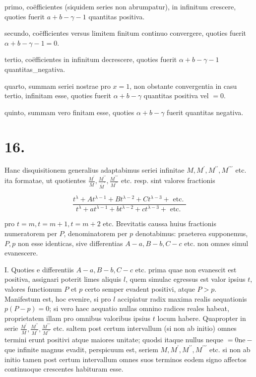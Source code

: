 \documentclass[10pt]{article}
\begin{document}
primo, coëfficientes (siquidem series non abrumpatur), in infinitum crescere, quoties fuerit \(a+b-\gamma-1\) quantitas positiva.

secundo, coëfficientes versus limitem finitum continuo convergere, quoties fuerit \(\alpha+b-\gamma-1=0\).

tertio, coëfficientes in infinitum decrescere, quoties fuerit \(\alpha+b-\gamma-1\) quantitas\_negativa.

quarto, summam seriei nostrae pro \(x=1\), non obstante convergentia in casu tertio, infinitam esse, quoties fuerit \(\alpha+b-\gamma\) quantitas positiva vel \(=0\).

quinto, summam vero finitam esse, quoties \(\alpha+b-\gamma\) fuerit quantitas negativa.

\section*{16.}
Hanc disquisitionem generalius adaptabimus seriei infinitae \(M, M^{\prime}, M^{\prime \prime}, M^{\prime \prime \prime}\) etc. ita formatae, ut quotientes \(\frac{M^{\prime}}{\bar{M}}, \frac{M^{\prime \prime}}{\bar{M}^{\prime}}, \frac{M^{\prime \prime \prime}}{M^{\prime \prime}}\) etc. resp. sint valores fractionis

\[
\frac{t^{\lambda}+A t^{\lambda-1}+B t^{\lambda-2}+C t^{\lambda-3}+\text { etc. }}{t^{\lambda}+a t^{\lambda-1}+b t^{\lambda-2}+c t^{\lambda-3}+\text { etc. }}
\]

pro \(t=m, t=m+1, t=m+2\) etc. Brevitatis caussa huius fractionis numeratorem per \(P\), denominatorem per \(p\) denotabimus: praeterea supponemus, \(P, p\) non esse identicas, sive differentias \(A-a, B-b, C-c\) etc. non omnes simul evanescere.

I. Quoties e differentiis \(A-a, B-b, C-c\) etc. prima quae non evanescit est positiva, assignari poterit limes aliquis \(l\), quem simulac egressus est valor ipsius \(t\), valores functionum \(P\) et \(p\) certo semper evadent positivi, atque \(P>p\). Manifestum est, hoc evenire, si pro \(l\) accipiatur radix maxima realis aequationis \(p(P-p)=0\); si vero haec aequatio nullas omnino radices reales habeat, proprietatem illam pro omnibus valoribus ipsius \(t\) locum habere. Quapropter in serie \(\frac{M^{\prime}}{\bar{M}}, \frac{M^{\prime \prime}}{M^{\prime}}, \frac{M^{\prime \prime \prime}}{M^{\prime \prime}}\) etc. saltem post certum intervallum (si non ab initio) omnes termini erunt positivi atque maiores unitate; quodsi itaque nullus neque \(=0 \mathrm{ne}-\) que infinite magnus evadit, perspicuum est,
seriem \(M, M^{\prime}, M^{\prime \prime}, M^{\prime \prime \prime}\) etc. si non ab initio tamen post certum intervallum omnes suos terminos eodem signo affectos continuoque crescentes habituram esse.
\end{document}
